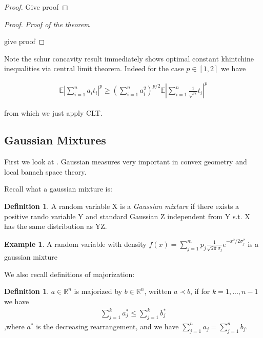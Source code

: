 \documentclass[10pt]{article}
\newcommand{\E}{\mathbb{E}}
\newcommand{\1}{\textbf{1}}
\newcommand{\R}{\mathbb{R}}
\theoremstyle{remark}
\theoremstyle{definition}
\newtheorem{defn}[theorem]{Definition}
\newtheorem{exmp}[theorem]{Example}
\begin{document}
\begin{proof}
	Give proof
\end{proof}

\begin{proof}\textit{Proof of the theorem}

	give proof
\end{proof}

Note the schur concavity result immediately shows optimal constant khintchine inequalities via central limit theorem. Indeed for the case $p \in [1,2]$ we have

\begin{align*}
	\E |\sum_{i=1}^n a_it_i|^p \geq (\sum_{i=1}^na_i^2)^{p/2}\E|\sum_{i=1}^n \frac{1}{\sqrt{n}}t_i|^p
\end{align*}

from which we just apply CLT.



\subsection{Gaussian Mixtures}

First we look at \cite{ENT}. Gaussian measures very important in convex geometry and local banach space theory. 

Recall what a gaussian mixture is:

\begin{defn}
	A random variable X is a \textit{Gaussian mixture} if there exists a positive rando variable Y and standard Gaussian Z independent from Y s.t. X has the same distribution as YZ.
\end{defn}

\begin{exmp}
	A random variable with density $f(x) = \sum_{j=1}^m p_j \frac{1}{\sqrt{2\pi}\sigma_j}e^{-x^2/2\sigma_j^2}$ is a gaussian mixture
\end{exmp}

We also recall definitions of majorization:

\begin{defn}
	$a \in \R^n$ is majorized by $b \in \R^n$, written $a \prec b$, if for $k = 1,...,n-1$ we have 
	\begin{align*}
		\sum_{j=1}^k a_j^* \leq \sum_{j=1}^k b_j^*
	\end{align*}
	,where $a^*$ is the decreasing rearrangement, and we have $\sum_{j=1}^n a_j = \sum_{j=1}^n b_j$. 
\end{defn}
\end{document}
